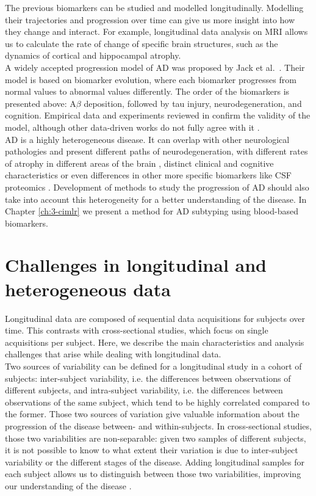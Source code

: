 The previous biomarkers can be studied and modelled longitudinally. Modelling their trajectories and progression over time can give us more insight into how they change and interact. For example, longitudinal data analysis on MRI allows us to calculate the rate of change of specific brain structures, such as the dynamics of cortical and hippocampal atrophy. \\

A widely accepted progression model of AD was proposed by Jack et al.\ \cite{Jack2010}. Their model is based on biomarker evolution, where each biomarker progresses from normal values to abnormal values differently. The order of the biomarkers is presented above: A$\beta$ deposition, followed by tau injury, neurodegeneration, and cognition. Empirical data and experiments reviewed in \cite{Jack2013} confirm the validity of the model, although other data-driven works do not fully agree with it \cite{Iturria-Medina2016}. \\

AD is a highly heterogeneous disease. It can overlap with other neurological pathologies and present different paths of neurodegeneration, with different rates of atrophy in different areas of the brain \cite{Lam2013,Poulakis2018}, distinct clinical and cognitive characteristics \cite{Murray2011} or even differences in other more specific biomarkers like CSF proteomics \cite{Tijms2020}. Development of methods to study the progression of AD should also take into account this heterogeneity for a better understanding of the disease. In Chapter \ref{ch:3-cimlr} we present a method for AD subtyping using blood-based biomarkers. \\

\section{Challenges in longitudinal and heterogeneous data}

Longitudinal data are composed of sequential data acquisitions for subjects over time. This contrasts with cross-sectional studies, which focus on single acquisitions per subject. Here, we describe the main characteristics and analysis challenges that arise while dealing with longitudinal data. \\

Two sources of variability can be defined for a longitudinal study in a cohort of subjects: inter-subject variability, i.e. the differences between observations of different subjects, and intra-subject variability, i.e. the differences between observations of the same subject, which tend to be highly correlated compared to the former. Those two sources of variation give valuable information about the progression of the disease between- and within-subjects. In cross-sectional studies, those two variabilities are non-separable: given two samples of different subjects, it is not possible to know to what extent their variation is due to inter-subject variability or the different stages of the disease. Adding longitudinal samples for each subject allows us to distinguish between those two variabilities, improving our understanding of the disease \cite{Fitzmaurice2008}. \\

